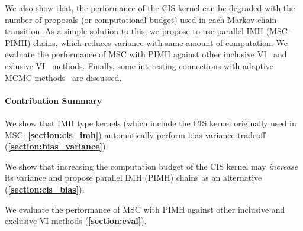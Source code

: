 We also show that, the performance of the CIS kernel can be degraded with the number of proposals (or computational budget) used in each Markov-chain transition.
As a simple solution to this, we propose to use parallel IMH (MSC-PIMH) chains, which reduces variance with same amount of computation.
We evaluate the performance of MSC with PIMH against other inclusive VI~\citep{DBLP:journals/corr/BornscheinB14, NEURIPS2020_b2070693} and exlusive VI~\citep{pmlr-v33-ranganath14, JMLR:v18:16-107} methods.
Finally, some interesting connections with adaptive MCMC methods~\citep{10.1007/s11222-008-9110-y} are discussed.

\paragraph{Contribution Summary}
\begin{enumerate*}[label=\textbf{(\roman*)}]
\item We show that IMH type kernels (which include the CIS kernel originally used in MSC; \textbf{\cref{section:cis_imh}}) automatically perform bias-variance tradeoff (\textbf{\cref{section:bias_variance}}).
\item We show that increasing the computation budget of the CIS kernel may \textit{increase} its variance and propose parallel IMH (PIMH) chains as an alternative (\textbf{\cref{section:cis_bias}}).
\item We evaluate the performance of MSC with PIMH against other inclusive and exclusive VI methods (\textbf{\cref{section:eval}}).
\end{enumerate*}

